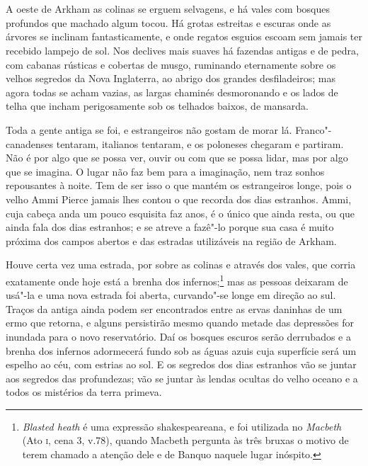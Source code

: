 \chapter*{}

A oeste de Arkham as colinas se erguem selvagens, e há vales com bosques
profundos que machado algum tocou. Há grotas estreitas e escuras onde as
árvores se inclinam fantasticamente, e onde regatos esguios escoam sem
jamais ter recebido lampejo de sol. Nos declives mais suaves há fazendas
antigas e de pedra, com cabanas rústicas e cobertas de musgo, ruminando
eternamente sobre os velhos segredos da Nova Inglaterra, ao abrigo dos
grandes desfiladeiros; mas agora todas se acham vazias, as largas
chaminés desmoronando e os lados de telha que incham perigosamente sob
os telhados baixos, de mansarda.

Toda a gente antiga se foi, e estrangeiros não gostam de morar lá.
Franco"-canadenses tentaram, italianos tentaram, e os poloneses chegaram
e partiram. Não é por algo que se possa ver, ouvir ou com que se possa
lidar, mas por algo que se imagina. O lugar não faz bem para a
imaginação, nem traz sonhos repousantes à noite. Tem de ser isso o que
mantém os estrangeiros longe, pois o velho Ammi Pierce jamais lhes
contou o que recorda dos dias estranhos. Ammi, cuja cabeça anda um pouco
esquisita faz anos, é o único que ainda resta, ou que ainda fala dos
dias estranhos; e se atreve a fazê"-lo porque sua casa é muito próxima
dos campos abertos e das estradas utilizáveis na região de Arkham.

Houve certa vez uma estrada, por sobre as colinas e através dos vales,
que corria exatamente onde hoje está a brenha dos infernos;\footnote{\emph{Blasted
  heath} é uma expressão shakespeareana, e foi utilizada no
  \emph{Macbeth} (Ato \textsc{i}, cena 3, v.78), quando Macbeth pergunta às três
  bruxas o motivo de terem chamado a atenção dele e de Banquo naquele
  lugar inóspito.} mas as pessoas deixaram de usá"-la e uma nova estrada
foi aberta, curvando"-se longe em direção ao sul. Traços da antiga ainda
podem ser encontrados entre as ervas daninhas de um ermo que retorna, e
alguns persistirão mesmo quando metade das depressões for inundada para
o novo reservatório. Daí os bosques escuros serão derrubados e a brenha
dos infernos adormecerá fundo sob as águas azuis cuja superfície será um
espelho ao céu, com estrias ao sol. E os segredos dos dias estranhos vão
se juntar aos segredos das profundezas; vão se juntar às lendas ocultas
do velho oceano e a todos os mistérios da terra primeva.

